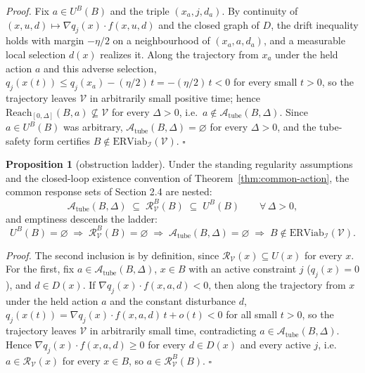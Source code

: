 \documentclass[11pt]{article}
\theoremstyle{definition}
\newtheorem{proposition}{Proposition}
\begin{document}
\emph{Proof.} Fix \(a\in U^B(B)\) and the triple \((x_a,j,d_a)\). By
continuity of \((x,u,d)\mapsto\nabla q_j(x)\cdot f(x,u,d)\) and the closed
graph of \(D\), the drift inequality holds with margin \(-\eta/2\) on a
neighbourhood of \((x_a,a,d_a)\), and a measurable local selection
\(d(x)\) realizes it. Along the trajectory from \(x_a\) under the held
action \(a\) and this adverse selection,
\(q_j(x(t))\le q_j(x_a)-(\eta/2)\,t=-(\eta/2)\,t<0\) for every small
\(t>0\), so the trajectory leaves \(\mathcal V\) in arbitrarily small
positive time; hence \(\mathrm{Reach}_{[0,\Delta]}(B,a)\not\subseteq\mathcal V\)
for every \(\Delta>0\), i.e.\ \(a\notin\mathcal{A}_{\mathrm{tube}}(B,\Delta)\).
Since \(a\in U^B(B)\) was arbitrary,
\(\mathcal{A}_{\mathrm{tube}}(B,\Delta)=\varnothing\) for every
\(\Delta>0\), and the tube-safety form certifies
\(B\notin\mathrm{ERViab}_{\mathcal I}(\mathcal V)\). \ensuremath{\square}

\begin{proposition}[obstruction ladder]\label{prop:ladder}
Under the standing regularity assumptions and the closed-loop existence
convention of Theorem~\ref{thm:common-action}, the common response sets
of Section 2.4 are nested:
\[\mathcal{A}_{\mathrm{tube}}(B,\Delta) \;\subseteq\; \mathcal{R}_{\mathcal{V}}^B(B) \;\subseteq\; U^B(B) \qquad \forall\,\Delta>0,\]
and emptiness descends the ladder:
\[U^B(B)=\varnothing \;\Longrightarrow\; \mathcal{R}_{\mathcal{V}}^B(B)=\varnothing \;\Longrightarrow\; \mathcal{A}_{\mathrm{tube}}(B,\Delta)=\varnothing \;\Longrightarrow\; B\notin\mathrm{ERViab}_{\mathcal{I}}(\mathcal{V}).\]
\end{proposition}

\emph{Proof.} The second inclusion is by definition, since
\(\mathcal{R}_{\mathcal{V}}(x)\subseteq U(x)\) for every \(x\). For the
first, fix \(a\in\mathcal{A}_{\mathrm{tube}}(B,\Delta)\), \(x\in B\) with
an active constraint \(j\) (\(q_j(x)=0\)), and \(d\in D(x)\). If
\(\nabla q_j(x)\cdot f(x,a,d)<0\), then along the trajectory from \(x\)
under the held action \(a\) and the constant disturbance \(d\),
\(q_j(x(t))=\nabla q_j(x)\cdot f(x,a,d)\,t+o(t)<0\) for all small
\(t>0\), so the trajectory leaves \(\mathcal V\) in arbitrarily small
time, contradicting \(a\in\mathcal{A}_{\mathrm{tube}}(B,\Delta)\). Hence
\(\nabla q_j(x)\cdot f(x,a,d)\ge 0\) for every \(d\in D(x)\) and every
active \(j\), i.e.\ \(a\in\mathcal{R}_{\mathcal{V}}(x)\) for every
\(x\in B\), so \(a\in\mathcal{R}_{\mathcal{V}}^B(B)\). \ensuremath{\square}
\end{document}
